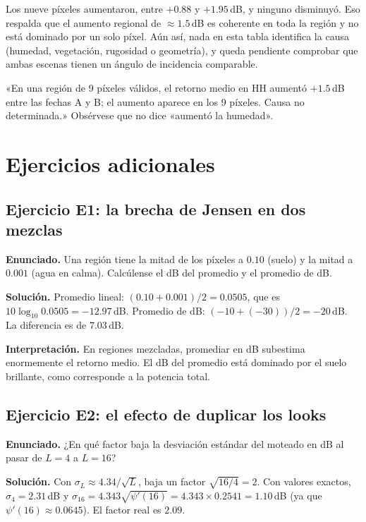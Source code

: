 \documentclass[11pt,a4paper]{article}
\begin{document}
Los nueve píxeles aumentaron, entre $+0.88$ y $+1.95$\,dB, y ninguno disminuyó. Eso respalda que el aumento
regional de $\approx1.5$\,dB es coherente en toda la región y no está dominado por un solo píxel. Aún así,
nada en esta tabla identifica la causa (humedad, vegetación, rugosidad o geometría), y queda pendiente
comprobar que ambas escenas tienen un ángulo de incidencia comparable.

\begin{ejemplo}
«En una región de 9 píxeles válidos, el retorno medio en HH aumentó $+1.5$\,dB entre las fechas A y B; el
aumento aparece en los 9 píxeles. Causa no determinada.» Obsérvese que no dice «aumentó la humedad».
\end{ejemplo}

\section{Ejercicios adicionales}
\label{sec:ej-extra}

\subsection*{Ejercicio E1: la brecha de Jensen en dos mezclas}
\textbf{Enunciado.} Una región tiene la mitad de los píxeles a $0.10$ (suelo) y la mitad a $0.001$ (agua en calma).
Calcúlense el dB del promedio y el promedio de dB.

\textbf{Solución.} Promedio lineal: $(0.10+0.001)/2=0.0505$, que es $10\log_{10}0.0505=-12.97$\,dB. Promedio de
dB: $(-10+(-30))/2=-20$\,dB. La diferencia es de $7.03$\,dB.

\textbf{Interpretación.} En regiones mezcladas, promediar en dB subestima enormemente el retorno medio. El dB del promedio
está dominado por el suelo brillante, como corresponde a la potencia total.

\subsection*{Ejercicio E2: el efecto de duplicar los looks}
\textbf{Enunciado.} ¿En qué factor baja la desviación estándar del moteado en dB al pasar de $L=4$ a $L=16$?

\textbf{Solución.} Con $\sigma_L\approx4.34/\sqrt L$, baja un factor $\sqrt{16/4}=2$. Con valores exactos,
$\sigma_4=2.31$\,dB y $\sigma_{16}=4.343\sqrt{\psi'(16)}=4.343\times0.2541=1.10$\,dB (ya que $\psi'(16)\approx0.0645$).
El factor real es $2.09$.
\end{document}
